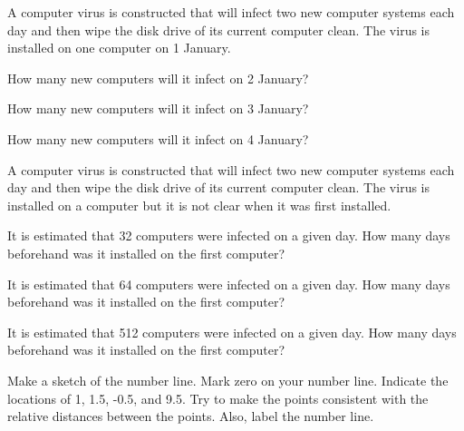 
\begin{problem}
\item A computer virus is constructed that will infect two new
  computer systems each day and then wipe the disk drive of its
  current computer clean.  The virus is installed on one computer on
  1 January.
  \begin{subproblem}
  \item How many new computers will it infect on 2 January?
    \vfill
  \item How many new computers will it infect on 3 January?
    \vfill
  \item How many new computers will it infect on 4 January?
    \vfill
  \end{subproblem}
\item A computer virus is constructed that will infect two new
  computer systems each day and then wipe the disk drive of its
  current computer clean.  The virus is installed on a computer but it
  is not clear when it was first installed.
  \begin{subproblem}
  \item It is estimated that 32 computers were infected on a given
    day. How many days beforehand was it installed on the first computer?
    \vfill
  \item It is estimated that 64 computers were infected on a given
    day. How many days beforehand was it installed on the first computer?
    \vfill
  \item It is estimated that 512 computers were infected on a given
    day. How many days beforehand was it installed on the first computer?
    \vfill
  \end{subproblem}
  \clearpage
\item Make a sketch of the number line. Mark zero on your number
  line. Indicate the locations of 1, 1.5, -0.5, and 9.5. Try to make
  the points consistent with the relative distances between the
  points. Also, label the number line.
\end{problem}


